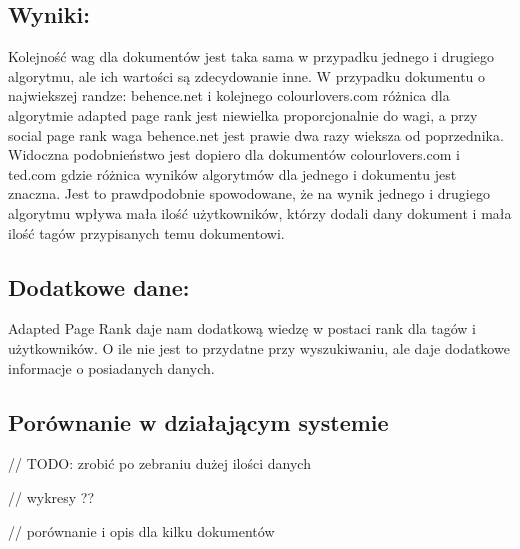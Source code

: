 \subsection*{Wyniki:}
Kolejność wag dla dokumentów jest taka sama w przypadku jednego i drugiego algorytmu, ale ich wartości są zdecydowanie inne. W przypadku dokumentu o najwiekszej randze: behence.net i kolejnego colourlovers.com różnica dla algorytmie adapted page rank jest niewielka proporcjonalnie do wagi, a przy social page rank waga behence.net jest prawie dwa razy wieksza od poprzednika. Widoczna podobnieństwo jest dopiero dla dokumentów colourlovers.com i ted.com gdzie różnica wyników algorytmów dla jednego i dokumentu jest znaczna. Jest to prawdpodobnie spowodowane, że na wynik jednego i drugiego algorytmu wpływa mała ilość użytkowników, którzy dodali dany dokument i mała ilość tagów przypisanych temu dokumentowi.

\subsection*{Dodatkowe dane:}
Adapted Page Rank daje nam dodatkową wiedzę w postaci rank dla tagów i użytkowników. O ile nie jest to przydatne przy wyszukiwaniu, ale daje dodatkowe informacje o posiadanych danych.



\subsection{Porównanie w działającym systemie}
// TODO: zrobić po zebraniu dużej ilości danych

// wykresy ??

// porównanie i opis dla kilku dokumentów


















